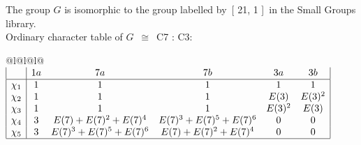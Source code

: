 \documentclass[varwidth=\maxdimen,border=10]{standalone}
\begin{document}
The group $G$ is isomorphic to the group labelled by\ [ 21, 1 ]\ in the Small Groups library.\\
Ordinary character table of $G$\ $\cong$\ C7 : C3:\\
\begin{center}
\begin{tabular}{@{}l@{}l@{}l@{}}
\hline
\(\begin{array}{|l|ccccc|}
  & 1a & 7a & 7b & 3a & 3b\\ \hline
\chi_{1} & 1 & 1 & 1 & 1 & 1\\
\chi_{2} & 1 & 1 & 1 & E(3) & E(3)^{2}\\
\chi_{3} & 1 & 1 & 1 & E(3)^{2} & E(3)\\
\chi_{4} & 3 & E(7)+E(7)^{2}+E(7)^{4} & E(7)^{3}+E(7)^{5}+E(7)^{6} & 0 & 0\\
\chi_{5} & 3 & E(7)^{3}+E(7)^{5}+E(7)^{6} & E(7)+E(7)^{2}+E(7)^{4} & 0 & 0\\
\hline
\end{array}\)\\
\end{tabular}
\end{center}
\end{document}
